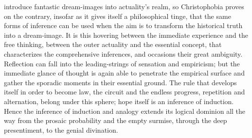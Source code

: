 \documentclass[12pt]{book}
\begin{document}
introduce fantastic dream-images into actuality's realm, so Christophobia
proves on the contrary, insofar as it gives itself a philosophical tinge,
that the same forms of inference can be used when the aim is to transform
the historical truth into a dream-image. It is this hovering between the
immediate experience and the free thinking, between the outer actuality and
the essential concept, that characterizes the comprehensive inferences, and
occasions their great ambiguity. Reflection can fall into the
leading-strings of sensation and empiricism; but the immediate glance of
thought is again able to penetrate the empirical surface and gather the
sporadic moments in their essential ground. The rule that develops itself in
order to become law, the circuit and the endless progress, repetition and
alternation, belong under this sphere; hope itself is an inference of
induction. Hence the inference of induction and analogy extends its logical
dominion all the way from the prosaic probability and the empty surmise,
through the deep presentiment, to the genial divination.
\end{document}
